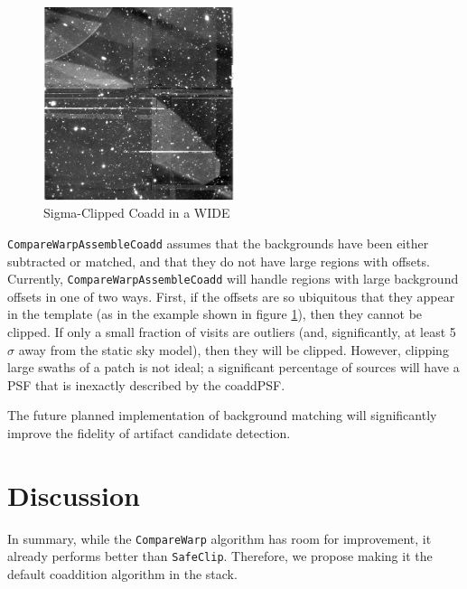 \documentclass[DM,authoryear,toc]{lsstdoc}
\begin{document}
\begin{figure}
\begin{centering}
\includegraphics[width=0.5\textwidth]{figures/templateWBackgrounds.png}
\par\end{centering}
\caption{\label{fig:backgroundOffsets}  Sigma-Clipped Coadd in a WIDE }
\end{figure}

\texttt{CompareWarpAssembleCoadd}  assumes that the backgrounds have been either subtracted or matched, and that they do not have large regions with offsets.
 Currently, \texttt{CompareWarpAssembleCoadd}  will handle regions with large background offsets in one of two ways.
 First, if the offsets are so ubiquitous that they appear in the template (as in the example shown in figure \ref{fig:backgroundOffsets}), then they cannot be clipped.
 If only a small fraction of visits are outliers  (and, significantly, at least 5$\sigma$ away from the static sky model), then they will be clipped.
 However, clipping large swaths of a patch is not ideal; a significant percentage of sources will have a PSF that is inexactly described by the coaddPSF.

The future planned implementation of background matching will significantly improve the fidelity of artifact candidate detection.


\section{Discussion}

In summary, while the \texttt{CompareWarp} algorithm has room for improvement, it already performs better than \texttt{SafeClip}.
Therefore, we propose making it the default coaddition algorithm in the stack.




\end{document}
